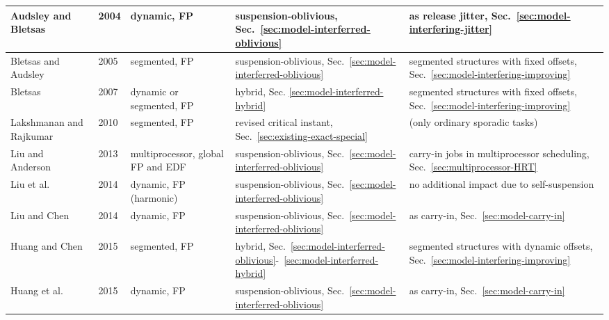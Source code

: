 \begin{table}[h!]
{\begin{tabular}{||C{2.5cm}|C{1cm}|C{3cm}||C{4cm}|C{6cm}|}
\hline
Audsley and Bletsas~\cite{ECRTS-AudsleyB04,RTAS-AudsleyB04} & 2004 & dynamic, FP& suspension-oblivious, Sec.~\ref{sec:model-interferred-oblivious}& as release jitter, Sec.~\ref{sec:model-interfering-jitter}  \\%
\hline 
Bletsas and Audsley~\cite{RTCSA-BletsasA05} & 2005 & segmented, FP& suspension-oblivious, Sec.~\ref{sec:model-interferred-oblivious}& segmented structures with fixed offsets, Sec.~\ref{sec:model-interfering-improving}\\%
\hline
Bletsas~\cite[Chapter 5.4]{bletsas:thesis} & 2007 & dynamic or segmented, FP& hybrid, Sec. \ref{sec:model-interferred-hybrid}&segmented structures with fixed offsets, Sec.~\ref{sec:model-interfering-improving} \\%
\hline 
Lakshmanan and Rajkumar~\cite{LR:rtas10} & 2010 & segmented, FP&
revised critical instant, Sec.~\ref{sec:existing-exact-special} &
(only ordinary sporadic tasks) \\%
\hline
Liu and Anderson~\cite{DBLP:conf/ecrts/LiuA13} & 2013 & multiprocessor, global FP and EDF &  suspension-oblivious, Sec.~\ref{sec:model-interferred-oblivious}& carry-in jobs in multiprocessor scheduling, Sec.~\ref{sec:multiprocessor-HRT} \\%
\hline 
Liu et al. \cite{DBLP:conf/ecrts/LiuCH014} & 2014 & dynamic, FP (harmonic)& suspension-oblivious, Sec.~\ref{sec:model-interferred-oblivious}& no additional impact due to self-suspension\\%
\hline 
Liu and Chen~\cite{LiuChen:rtss2014} & 2014 & dynamic, FP& suspension-oblivious, Sec.~\ref{sec:model-interferred-oblivious}& as carry-in, Sec.~\ref{sec:model-carry-in}\\%
\hline
Huang and Chen \cite{Huang:multiseg}& 2015 & segmented, FP& hybrid, Sec.~\ref{sec:model-interferred-oblivious}-~\ref{sec:model-interferred-hybrid} & segmented structures with dynamic offsets, Sec.~\ref{sec:model-interfering-improving}\\%
\hline
Huang et al.~\cite{huangpass:dac2015} & 2015 & dynamic, FP& suspension-oblivious, Sec.~\ref{sec:model-interferred-oblivious}& as carry-in,  Sec.~\ref{sec:model-carry-in}\\%

\end{tabular}}
\end{table}
